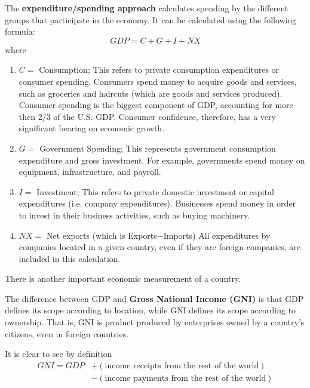\documentclass{article}
\begin{document}
  \begin{definition}
    The \textbf{expenditure/spending approach} calculates spending by the different groups that participate in the economy. It can be calculated using the following formula: 
    \[GDP = C + G + I + NX\]
    where
    \begin{enumerate}
        \item $C = $ Consumption; This refers to private consumption expenditures or consumer spending. Consumers spend money to acquire goods and services, such as groceries and haircuts (which are goods and services produced). Consumer spending is the biggest component of GDP, accounting for more then $2/3$ of the U.S. GDP. Consumer confidence, therefore, has a very significant bearing on economic growth. 
        \item $G = $ Government Spending; This represents government consumption expenditure and gross investment. For example, governments spend money on equipment, infrastructure, and payroll. 
        \item $I = $ Investment; This refers to private domestic investment or capital expenditures (i.e. company expenditures). Businesses spend money in order to invest in their business activities, such as buying machinery. 
        \item $NX = $ Net exports (which is Exports$-$Imports) All expenditures by companies located in a given country, even if they are foreign companies, are included in this calculation. 
    \end{enumerate}
  \end{definition}

  There is another important economic measurement of a country. 

  \begin{definition}
    The difference between GDP and \textbf{Gross National Income (GNI)} is that GDP defines its scope according to location, while GNI defines its scope according to ownership. That is, GNI is product produced by enterprises owned by a country's citizens, even in foreign countries.

    It is clear to see by definition 
    \begin{align*}
        GNI = GDP & + (\text{income receipts from the rest of the world}) \\
        & - (\text{income payments from the rest of the world})
    \end{align*}
  \end{definition}
\end{document}
